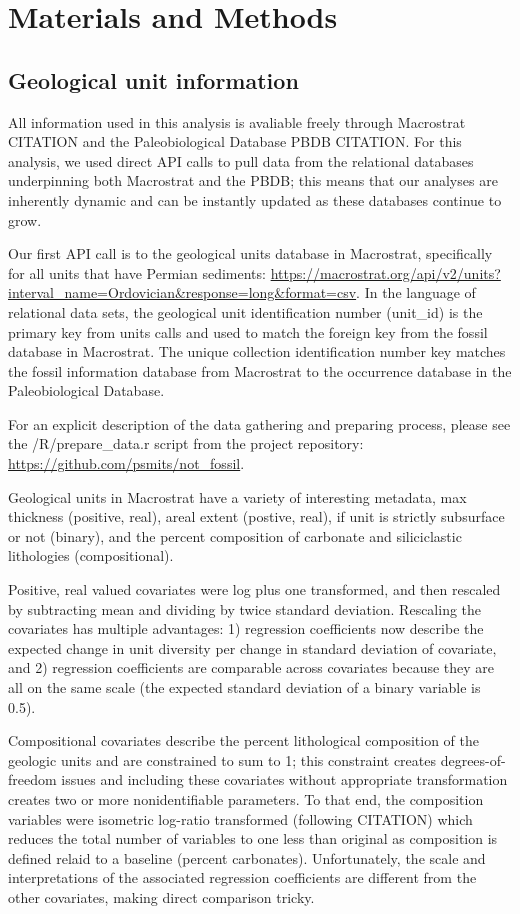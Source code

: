 \documentclass[12pt,letterpaper]{article}
\begin{document}
\section{Materials and Methods}

\subsection{Geological unit information}
All information used in this analysis is avaliable freely through Macrostrat CITATION and the Paleobiological Database PBDB CITATION. For this analysis, we used direct API calls to pull data from the relational databases underpinning both Macrostrat and the PBDB; this means that our analyses are inherently dynamic and can be instantly updated as these databases continue to grow.

Our first API call is to the geological units database in Macrostrat, specifically for all units that have Permian sediments: \url{https://macrostrat.org/api/v2/units?interval_name=Ordovician&response=long&format=csv}. In the language of relational data sets, the geological unit identification number (unit_id) is the primary key from units calls and used to match the foreign key from the fossil database in Macrostrat. The unique collection identification number key matches the fossil information database from Macrostrat to the occurrence database in the Paleobiological Database.

For an explicit description of the data gathering and preparing process, please see the /R/prepare_data.r script from the project repository: \url{https://github.com/psmits/not_fossil}.

Geological units in Macrostrat have a variety of interesting metadata, max thickness (positive, real), areal extent (postive, real), if unit is strictly subsurface or not (binary), and the percent composition of carbonate and siliciclastic lithologies (compositional). 

Positive, real valued covariates were log plus one transformed, and then rescaled by subtracting mean and dividing by twice standard deviation. Rescaling the covariates has multiple advantages: 1) regression coefficients now describe the expected change in unit diversity per change in standard deviation of covariate, and 2) regression coefficients are comparable across covariates because they are all on the same scale (the expected standard deviation of a binary variable is 0.5).

Compositional covariates describe the percent lithological composition of the geologic units and are constrained to sum to 1; this constraint creates degrees-of-freedom issues and including these covariates without appropriate transformation creates two or more nonidentifiable parameters. To that end, the composition variables were isometric log-ratio transformed (following CITATION) which reduces the total number of variables to one less than original as composition is defined relaid to a baseline (percent carbonates). Unfortunately, the scale and interpretations of the associated regression coefficients are different from the other covariates, making direct comparison tricky.
\end{document}
